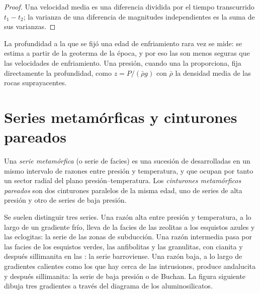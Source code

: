 \begin{proof}
Una velocidad media es una diferencia dividida por el tiempo transcurrido $t_1 - t_2$; la varianza de una
diferencia de magnitudes independientes es la suma de sus varianzas.
\end{proof}

La profundidad a la que se fijó una edad de enfriamiento rara vez se mide: se estima a partir de la
geoterma de la época, y por eso las  son menos seguras que las velocidades de enfriamiento.
Una presión, cuando una  la proporciona, fija directamente la profundidad, como
$z = P/(\bar\rho g)$ con $\bar\rho$ la densidad media de las rocas suprayacentes.

\section{Series metamórficas y cinturones pareados}\label{sec:b2:pt-paths:series}

\begin{definition}\label{def:b2:pt-paths:series}
Una \emph{serie metamórfica} (o serie de facies) es una sucesión de
 desarrolladas en un mismo intervalo de razones entre presión y temperatura,
y que ocupan por tanto un sector radial del plano presión--temperatura.
Los \emph{cinturones metamórficos pareados} son dos cinturones paralelos de
la misma edad, uno de series de alta presión y otro de series de baja presión.
\end{definition}

Se suelen distinguir tres series. Una razón alta entre presión y temperatura, a lo largo de un
gradiente frío, lleva de la facies de las zeolitas a los esquistos azules y las eclogitas: la serie
de las zonas de subducción. Una razón intermedia pasa por las facies de los esquistos verdes, las anfibolitas y las
granulitas, con cianita y después sillimanita en las : la serie barroviense. Una razón
baja, a lo largo de gradientes calientes como los que hay cerca de las intrusiones, produce andalucita y después
sillimanita: la serie de baja presión o de Buchan. La figura siguiente dibuja tres gradientes
a través del diagrama de los aluminosilicatos.


